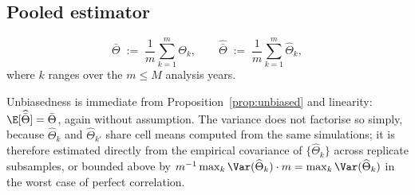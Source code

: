 \subsection{Pooled estimator}
\label{sec:loo-pooled}

\begin{definition}
\begin{equation}
  \bar{\Theta} \;:=\; \frac{1}{m}\sum_{k=1}^{m} \Theta_k ,
  \qquad
  \widehat{\bar{\Theta}} \;:=\; \frac{1}{m}\sum_{k=1}^{m} \widehat{\Theta}_k ,
\end{equation}
where $k$ ranges over the $m \le M$ analysis years.
\end{definition}

\noindent
Unbiasedness is immediate from Proposition~\ref{prop:unbiased} and linearity:
$\E[\widehat{\bar{\Theta}}] = \bar{\Theta}$, again without assumption. The variance does not
factorise so simply, because $\widehat{\Theta}_k$ and $\widehat{\Theta}_{k'}$ share cell means
computed from the same simulations; it is therefore estimated directly from the empirical
covariance of $\{\widehat{\Theta}_k\}$ across replicate subsamples, or bounded above by
$m^{-1}\max_k \Var(\widehat{\Theta}_k) \cdot m = \max_k \Var(\widehat{\Theta}_k)$ in the worst case
of perfect correlation.
